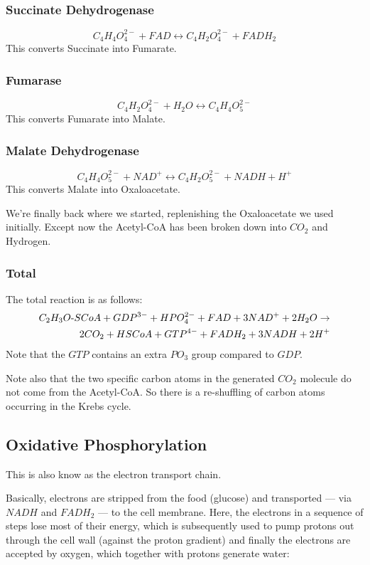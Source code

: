 \documentclass{article}
\def\mhyphen{{\hbox{-}}}
\begin{document}
\subsubsection{Succinate Dehydrogenase}
\[
    C_4H_4O_4^{2-} + FAD \leftrightarrow C_4H_2O_4^{2-} + FADH_2
\]
This converts Succinate into Fumarate.

\subsubsection{Fumarase}
\[
    C_4H_2O_4^{2-} + H_2O \leftrightarrow C_4H_4O_5^{2-}
\]
This converts Fumarate into Malate.

\subsubsection{Malate Dehydrogenase}\label{sec_malate_dehydrogenase}
\[
    C_4H_4O_5^{2-} + NAD^+ \leftrightarrow C_4H_2O_5^{2-} + NADH + H^+
\]
This converts Malate into Oxaloacetate.

We're finally back where we started, replenishing the Oxaloacetate we used initially.
Except now the Acetyl-CoA has been broken down into $CO_2$ and Hydrogen.

\subsubsection{Total}
The total reaction is as follows:
\[
    \begin{split}
    C_2H_3O{\mhyphen}SCoA + GDP^{3-}+ HPO_4^{2-} + FAD + 3NAD^+ + 2H_2O \rightarrow \\
    2CO_2 + HSCoA + GTP^{4-} + FADH_2 + 3NADH + 2H^+
    \end{split}
\]
Note that the $GTP$ contains an extra $PO_3$ group compared to $GDP$.

Note also that the two specific carbon atoms in the generated $CO_2$ molecule do not come
from the Acetyl-CoA. So there is a re-shuffling of carbon atoms occurring in the Krebs
cycle.

\subsection{Oxidative Phosphorylation}
This is also know as the electron transport chain.

Basically, electrons are stripped from the food (glucose) and transported --- via $NADH$
and $FADH_2$ --- to the cell membrane. Here, the electrons in a sequence of steps
lose most of their energy, which is subsequently used to pump protons out through
the cell wall (against the proton gradient) and finally the electrons are accepted by
oxygen, which together with protons generate water:
\end{document}
